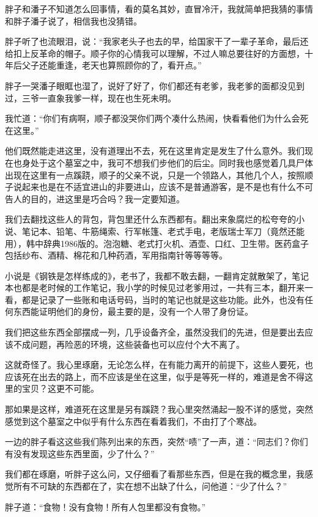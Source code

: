 胖子和潘子不知道怎么回事情，看的莫名其妙，直冒冷汗，我就简单把我猜的事情和胖子潘子说了，相信我也没猜错。

胖子听了也流眼泪，说：“我家老头子也去的早，给国家干了一辈子革命，最后还给扣上反革命的帽子。顺子你的心情我可以理解，不过人嘛总要往好的方面想，十年后父子还能重逢，老天也算照顾你的了，看开点。”

胖子一哭潘子眼眶也湿了，说好了好了，你们都还有老爹，我老爹的面都没见到过，三爷一直象我爹一样，现在也生死未明。

我忙道：“你们有病啊，顺子都没哭你们两个凑什么热闹，快看看他们为什么会死在这里。”

他们既然能走进这里，没有道理出不去，死在这里肯定是发生了什么意外。我们现在也身处于这个墓室之中，我可不想我们步他们的后尘。同时我也感觉着几具尸体出现在这里有一点蹊跷，顺子的父亲不说，只是一个领路人，其他几个人，按照顺子说起来也是在不适宜进山的非要进山，应该不是普通游客，是不是也有什么不可告人的目的，进这里是巧合吗？我一定要知道。

我们去翻找这些人的背包，背包里还什么东西都有。翻出来象腐烂的松夸夸的小说、笔记本、铅笔、牛筋绳索、行军帐篷、老式手电，老版瑞士军刀（竟然还能用），韩中辞典1986版的。泡泡糖、老式打火机、酒壶、口红、卫生带。医药盒子包括纱布、酒精、棉花和几种药酒，军用指南针等等等等。

小说是《钢铁是怎样练成的》，老书了，我都不敢去翻，一翻肯定就散架了，笔记本也都是老时候的工作笔记，我小学的时候见过老爹用过，一共有三本，翻开来一看，都是记录了一些账和电话号码，当时的笔记也就是这些功能。此外，也没有任何东西能证明他们的身份，最主要的是，没有一个人带了身份证。

我们把这些东西全部摆成一列，几乎设备齐全，虽然没我们的先进，但是要出去应该不成问题，再险恶的环境，这些装备也可以应付个大不离了。

这就奇怪了。我心里琢磨，无论怎么样，在有能力离开的前提下，这些人要死，也应该死在出去的路上，而不应该是坐在这里，似乎是等死一样的，难道是舍不得这里的宝贝？这更不可能。

那如果是这样，难道死在这里是另有蹊跷？我心里突然涌起一股不详的感觉，突然感觉到这个墓室之中似乎有什么东西在看着我们，不由打了个寒战。

一边的胖子看这这些我们陈列出来的东西，突然“啧”了一声，道：“同志们？你们有没有发现这些东西里面，少了什么？”

我们都在琢磨，听胖子这么问，又仔细看了看那些东西，但是在我的概念里，我感觉所有不可缺的东西都在了，实在想不出缺了什么，问他道：“少了什么？”

胖子道：“食物！没有食物！所有人包里都没有食物。”

